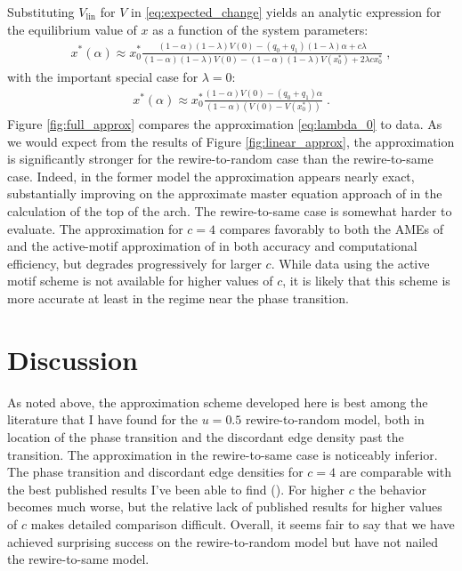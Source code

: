 \documentclass[english]{scrartcl}
\begin{document}
	Substituting $V_{\text{lin}}$ for $V$ in \eqref{eq:expected_change} yields an analytic expression for the equilibrium value of $x$ as a function of the system parameters: 
	\begin{align*}
		x^*(\alpha) \approx x^*_0\frac{(1-\alpha)(1-\lambda)V(0) - (q_0 + q_1)(1-\lambda)\alpha + c\lambda}{(1-\alpha)(1-\lambda)V(0)-(1-\alpha)(1-\lambda)V(x_0^*)  + 2\lambda cx_0^*}\;,
	\end{align*}
	with the important special case for $\lambda = 0$:
	\begin{align}
		x^*(\alpha) \approx x^*_0\frac{(1-\alpha)V(0) - (q_0 + q_1)\alpha}{(1-\alpha)(V(0) - V(x_0^*))}\;. \label{eq:lambda_0}
	\end{align}
	Figure \ref{fig:full_approx} compares the approximation \eqref{eq:lambda_0} to data. As we would expect from the results of Figure \ref{fig:linear_approx}, the approximation is significantly stronger for the rewire-to-random case than the rewire-to-same case. Indeed, in the former model the approximation appears nearly exact, substantially improving on the approximate master equation approach of \cite{Durrett2012} in the calculation of the top of the arch. The rewire-to-same case is somewhat harder to evaluate. The approximation for $c = 4$ compares favorably to both the AMEs of \cite{Durrett2012} and the active-motif approximation of \cite{Demirel2012} in both accuracy and computational efficiency, but degrades progressively for larger $c$. While data using the active motif scheme is not available for higher values of $c$, it is likely that this scheme is more accurate at least in the regime near the phase transition. 

\section{Discussion}

	As noted above, the approximation scheme developed here is best among the literature that I have found for the $u = 0.5$ rewire-to-random model, both in location of the phase transition and the discordant edge density past the transition. The approximation in the rewire-to-same case is noticeably inferior. The phase transition and discordant edge densities for $c = 4$ are comparable with the best published results I've been able to find (\cite{Demirel2012}). For higher $c$ the behavior becomes much worse, but the relative lack of published results for higher values of $c$ makes detailed comparison difficult. Overall, it seems fair to say that we have achieved surprising success on the rewire-to-random model but have not nailed the rewire-to-same model. 
\end{document}
